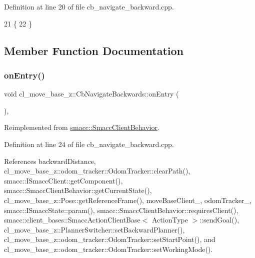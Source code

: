 Definition at line 20 of file cb\+\_\+navigate\+\_\+backward.\+cpp.


\begin{DoxyCode}
21     \{
22     \}
\end{DoxyCode}


\subsection{Member Function Documentation}
\mbox{\label{classcl__move__base__z_1_1CbNavigateBackwards_a545a5282f0ef6b0080b46002d6037567}} 
\subsubsection{\texorpdfstring{on\+Entry()}{onEntry()}}
{\footnotesize\ttfamily void cl\+\_\+move\+\_\+base\+\_\+z\+::\+Cb\+Navigate\+Backwards\+::on\+Entry (\begin{DoxyParamCaption}{ }\end{DoxyParamCaption})\hspace{0.3cm}{\ttfamily [override]}, {\ttfamily [virtual]}}



Reimplemented from \hyperlink{classsmacc_1_1SmaccClientBehavior_a7962382f93987c720ad432fef55b123f}{smacc\+::\+Smacc\+Client\+Behavior}.



Definition at line 24 of file cb\+\_\+navigate\+\_\+backward.\+cpp.



References backward\+Distance, cl\+\_\+move\+\_\+base\+\_\+z\+::odom\+\_\+tracker\+::\+Odom\+Tracker\+::clear\+Path(), smacc\+::\+I\+Smacc\+Client\+::get\+Component(), smacc\+::\+Smacc\+Client\+Behavior\+::get\+Current\+State(), cl\+\_\+move\+\_\+base\+\_\+z\+::\+Pose\+::get\+Reference\+Frame(), move\+Base\+Client\+\_\+, odom\+Tracker\+\_\+, smacc\+::\+I\+Smacc\+State\+::param(), smacc\+::\+Smacc\+Client\+Behavior\+::requires\+Client(), smacc\+::client\+\_\+bases\+::\+Smacc\+Action\+Client\+Base$<$ Action\+Type $>$\+::send\+Goal(), cl\+\_\+move\+\_\+base\+\_\+z\+::\+Planner\+Switcher\+::set\+Backward\+Planner(), cl\+\_\+move\+\_\+base\+\_\+z\+::odom\+\_\+tracker\+::\+Odom\+Tracker\+::set\+Start\+Point(), and cl\+\_\+move\+\_\+base\+\_\+z\+::odom\+\_\+tracker\+::\+Odom\+Tracker\+::set\+Working\+Mode().


